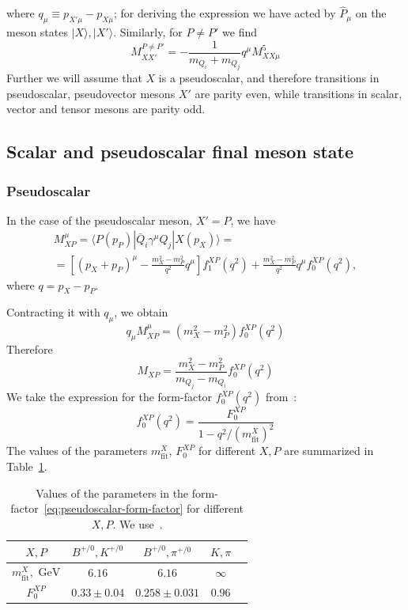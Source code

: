 \documentclass[a4paper,12pt,dvipsnames,usernames]{article}
\begin{document}
where $q_{\mu} \equiv p_{X'\mu} - p_{X\mu}$; for deriving the expression we have acted by $\hat{P}_{\mu}$ on the meson states $|X\rangle, |X'\rangle$. Similarly, for $P\neq P'$ we find
\begin{equation}
     M_{XX'}^{P \neq P'} = -\frac{1}{m_{Q_{i}} + m_{Q_{j}}}q^{\mu}M_{XX\mu}^{5}
\end{equation}
Further we will assume that $X$ is a pseudoscalar, and therefore transitions in pseudoscalar, pseudovector mesons $X'$ are parity even, while transitions in scalar, vector and tensor mesons are parity odd.

\subsection{Scalar and pseudoscalar final meson state}
\subsubsection{Pseudoscalar}
\label{app:pseudoscalar}
In the case of the pseudoscalar meson, $X' = P$, we have~\cite{Ebert:1997mg}
\begin{multline}
    M^{\mu}_{XP} = \langle P(p_{P})|\bar{Q}_{i}\gamma^{\mu}Q_{j}|X(p_{X})\rangle = \\ =\left[(p_{X}+p_{P})^{\mu} - \frac{m_{X}^{2} - m_{P}^{2}}{q^{2}}q^{\mu}\right]f^{XP}_{1}(q^{2})+\frac{m_{X}^{2} - m_{P}^{2}}{q^{2}}q^{\mu}f^{XP}_{0}(q^{2}),
\end{multline}
where $q = p_{X} - p_{P}$.

Contracting it with $q_{\mu}$, we obtain
\begin{equation}
    q_{\mu}M^{\mu}_{XP} = (m_{X}^{2} - m_{P}^{2})f^{XP}_{0}(q^{2})
\end{equation}
Therefore
\begin{equation}
    M_{XP} = \frac{m_{X}^{2} - m_{P}^{2}}{m_{Q_{j}} - m_{Q_{i}}}f^{XP}_{0}(q^{2})
\end{equation}
We take the expression for the form-factor $f^{XP}_{0}(q^{2})$ from~\cite{Ball:2004ye}:
\begin{equation}
\label{eq:pseudoscalar-form-factor}
f^{XP}_{0}(q^{2})=\frac{F_{0}^{XP}}{1-q^{2}/(m^{X}_{\text{fit}})^{2}}
\end{equation}
The values of the parameters $m_{\text{fit}}^{X}$, $F_{0}^{XP}$ for different $X,P$ are summarized in Table~\ref{tab:pseudoscalar-form-factor-parameters}.
\begin{table}[t!]
    \centering
    \begin{tabular}{|c|c|c|c|c|}
        \hline  
        $X, P$ & $B^{+/0}, K^{+/0}$ & $B^{+/0},\pi^{+/0}$ &$K,\pi$  \\
        \hline
        $m_{\text{fit}}^{X},\text{ GeV}$ & $6.16$ & $6.16$ & $\infty$ \\
        \hline
        $F_{0}^{XP}$ & $0.33\pm 0.04$ & $0.258\pm 0.031$ & $0.96$\\
        \hline
    \end{tabular}
    \caption{Values of the parameters in the form-factor~\eqref{eq:pseudoscalar-form-factor} for different $X,P$. We use~\cite{Ball:2004ye,Marciano:1996wy}.}
    \label{tab:pseudoscalar-form-factor-parameters}
\end{table}
\end{document}
